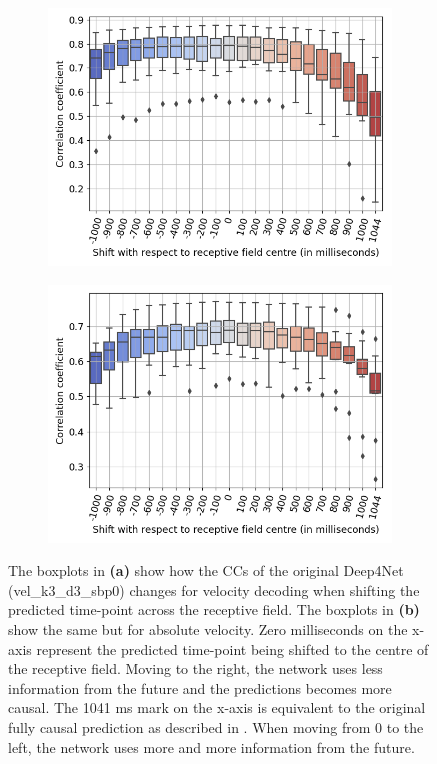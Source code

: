 \begin{figure}[!htbp]
\centering
\begin{subfigure}[a]{\textwidth}
    \centering
   \includegraphics[width=0.7\linewidth]{img/ch4/vel-shifting-performance-comparison}
   \caption{}
   \label{fig:vel-shifting-performance}
\end{subfigure}

\begin{subfigure}[b]{\textwidth}
    \centering
   \includegraphics[width=0.7\linewidth]{img/ch4/absVel-shifting-performance-comparison}
   \caption{}
   \label{fig:absVel-shiftig-performance}
\end{subfigure}
\caption[Gradual shifting - performance]{The boxplots in \textbf{(a)} show how the CCs of the original Deep4Net (vel\_k3\_d3\_sbp0) changes for velocity decoding when shifting the predicted time-point across the receptive field.
The boxplots in \textbf{(b)} show the same but for absolute velocity. Zero milliseconds on the x-axis represent the predicted time-point being shifted to the centre of the receptive field.
Moving to the right, the network uses less information from the future and the predictions becomes more causal.
The 1041 ms mark on the x-axis is equivalent to the original fully causal prediction as described in \cite{Hammer-2021}.
When moving from 0 to the left, the network uses more and more information from the future.}
\label{fig:shifting-performance}
\end{figure}


